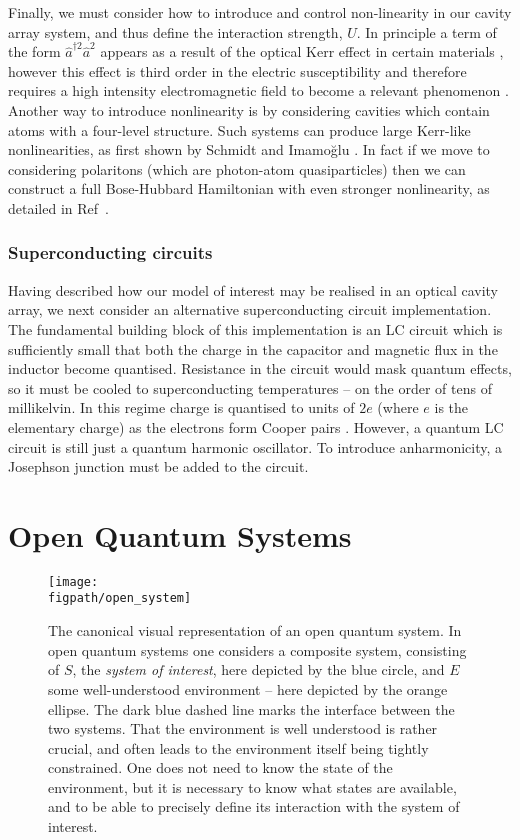 Finally, we must consider how to introduce and control non-linearity in our cavity array system, and thus define the interaction strength, \(U\). In principle a term of the form \(\hat{a}^{\dagger 2}\hat{a}^{2}\) appears as a result of the optical Kerr effect in certain materials \cite{Kitagawa1986}, however this effect is third order in the electric susceptibility and therefore requires a high intensity electromagnetic field to become a relevant phenomenon \cite{Boyd_KerrNL}. Another way to introduce nonlinearity is by considering cavities which contain atoms with a four-level structure. Such systems can produce large Kerr-like nonlinearities, as first shown by Schmidt and Imamo\u{g}lu \cite{Schmidt1996}. In fact if we move to considering polaritons (which are photon-atom quasiparticles) then we can construct a full Bose-Hubbard Hamiltonian with even stronger nonlinearity, as detailed in Ref~\cite{Hartmann2008}.

\subsubsection{Superconducting circuits}
Having described how our model of interest may be realised in an optical cavity array, we next consider an alternative superconducting circuit implementation. The fundamental building block of this implementation is an LC circuit which is sufficiently small that both the charge in the capacitor and magnetic flux in the inductor become quantised. Resistance in the circuit would mask quantum effects, so it must be cooled to superconducting temperatures -- on the order of tens of millikelvin. In this regime charge is quantised to units of \(2e\) (where \(e\) is the elementary charge) as the electrons form Cooper pairs \cite{Vool2017,Cooper1956}. However, a quantum LC circuit is still just a quantum harmonic oscillator. To introduce anharmonicity, a Josephson junction must be added to the circuit. 

\section{\label{sec:OQS}Open Quantum Systems}

\begin{figure}[ht!]
\centering
\texttt{[image: \\figpath/open\_system]}
\caption{The canonical visual representation of an open quantum system. In open quantum systems one considers a composite system, consisting of \(S\), the \emph{system of interest}, here depicted by the blue circle, and \(E\) some well-understood environment -- here depicted by the orange ellipse. The dark blue dashed line marks the interface between the two systems. That the environment is well understood is rather crucial, and often leads to the environment itself being tightly constrained. One does not need to know the state of the environment, but it is necessary to know what states are available, and to be able to precisely define its interaction with the system of interest.}
\label{fig:oqs1-1}
\end{figure}

